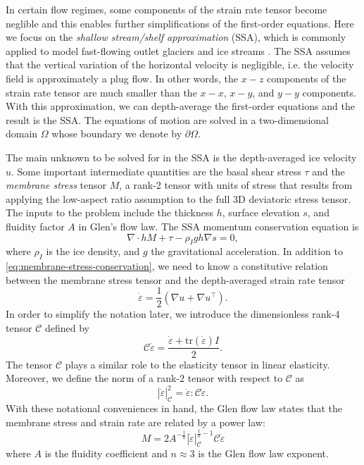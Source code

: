 \documentclass{article}
\theoremstyle{definition}
\theoremstyle{plain}
\begin{document}
In certain flow regimes, some components of the strain rate tensor become neglible and this enables further simplifications of the first-order equations.
Here we focus on the \emph{shallow stream/shelf approximation} (SSA), which is commonly applied to model fast-flowing outlet glaciers and ice streams \citep{greve2009dynamics}.
The SSA assumes that the vertical variation of the horizontal velocity is negligible, i.e. the velocity field is approximately a plug flow.
In other words, the $x-z$ components of the strain rate tensor are much smaller than the $x-x$, $x-y$, and $y-y$ components.
With this approximation, we can depth-average the first-order equations and the result is the SSA.
The equations of motion are solved in a two-dimensional domain $\Omega$ whose boundary we denote by $\partial\Omega$.

The main unknown to be solved for in the SSA is the depth-averaged ice velocity $u$.
Some important intermediate quantities are the basal shear stress $\tau$ and the \emph{membrane stress} tensor $M$, a rank-2 tensor with units of stress that results from applying the low-aspect ratio assumption to the full 3D deviatoric stress tensor.
The inputs to the problem include the thickness $h$, surface elevation $s$, and fluidity factor $A$ in Glen's flow law.
The SSA momentum conservation equation is
\begin{equation}
    \nabla\cdot hM + \tau - \rho_I gh\nabla s = 0,
    \label{eq:membrane-stress-conservation}
\end{equation}
where $\rho_I$ is the ice density, and $g$ the gravitational acceleration.
In addition to \eqref{eq:membrane-stress-conservation}, we need to know a constitutive relation between the membrane stress tensor and the depth-averaged strain rate tensor
\begin{equation}
    \dot\varepsilon = \frac{1}{2}\left(\nabla u + \nabla u^\top\right).
    \label{eq:strain-rate}
\end{equation}
In order to simplify the notation later, we introduce the dimensionless rank-4 tensor $\mathscr{C}$ defined by
\begin{equation}
    \mathscr{C}\dot\varepsilon = \frac{\dot\varepsilon + \text{tr}(\dot\varepsilon)I}{2}.
    \label{eq:elasticity-tensor}
\end{equation}
The tensor $\mathscr{C}$ plays a similar role to the elasticity tensor in linear elasticity.
Moreover, we define the norm of a rank-2 tensor with respect to $\mathscr{C}$ as
\begin{equation}
    |\dot\varepsilon|_{\mathscr{C}}^2 = \dot\varepsilon : \mathscr{C}\dot\varepsilon.
\end{equation}
With these notational conveniences in hand, the Glen flow law states that the membrane stress and strain rate are related by a power law:
\begin{equation}
    M = 2A^{-\frac{1}{n}}|\dot\varepsilon|_{\mathscr C}^{\frac{1}{n} - 1}\mathscr{C}\dot\varepsilon
    \label{eq:constitutive-relation}
\end{equation}
where $A$ is the fluidity coefficient and $n \approx 3$ is the Glen flow law exponent.
\end{document}
